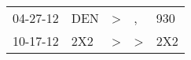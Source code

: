 \begin{supertabular}{lllll}
 04-27-12 &  DEN &  \textgreater &             , &  930 \\
 10-17-12 &  2X2 &  \textgreater &  \textgreater &  2X2 \\
\end{supertabular}
